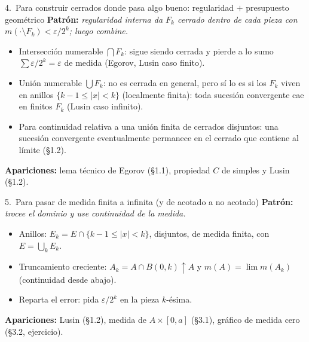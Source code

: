 \documentclass[11pt,twoside]{article}
\begin{document}
\begin{strategybox}{4.\ Para construir cerrados donde pasa algo bueno: regularidad $+$ presupuesto geométrico}
\textbf{Patrón:} \textit{regularidad interna da $F_{k}$ cerrado dentro de cada pieza con $m(\cdot \setminus F_{k}) < \varepsilon/2^{k}$; luego combine.}
\begin{itemize}[leftmargin=1.5em]
\item Intersección numerable $\bigcap F_{k}$: sigue siendo cerrada y pierde a lo sumo $\sum \varepsilon/2^{k} = \varepsilon$ de medida (Egorov, Lusin caso finito).
\item Unión numerable $\bigcup F_{k}$: no es cerrada en general, pero sí lo es si los $F_{k}$ viven en anillos $\{k - 1 \leq |x| < k\}$ (localmente finita): toda sucesión convergente cae en finitos $F_{k}$ (Lusin caso infinito).
\item Para continuidad relativa a una unión finita de cerrados disjuntos: una sucesión convergente eventualmente permanece en el cerrado que contiene al límite (§1.2).
\end{itemize}
\textbf{Apariciones:} lema técnico de Egorov (§1.1), propiedad $C$ de simples y Lusin (§1.2).
\end{strategybox}

\begin{strategybox}{5.\ Para pasar de medida finita a infinita (y de acotado a no acotado)}
\textbf{Patrón:} \textit{trocee el dominio y use continuidad de la medida.}
\begin{itemize}[leftmargin=1.5em]
\item Anillos: $E_{k} = E \cap \{k-1 \leq |x| < k\}$, disjuntos, de medida finita, con $E = \bigcup_{k} E_{k}$.
\item Truncamiento creciente: $A_{k} = A \cap B(0,k) \uparrow A$ y $m(A) = \lim m(A_{k})$ (continuidad desde abajo).
\item Reparta el error: pida $\varepsilon/2^{k}$ en la pieza $k$-ésima.
\end{itemize}
\textbf{Apariciones:} Lusin (§1.2), medida de $A \times [0,a]$ (§3.1), gráfico de medida cero (§3.2, ejercicio).
\end{strategybox}
\end{document}
